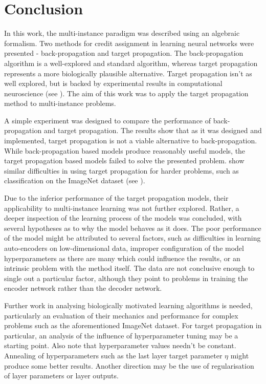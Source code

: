 \chapter*{Conclusion}

In this work, the multi-instance paradigm was described using an algebraic formalism. Two methods for credit assignment in learning neural networks were presented - back-propagation and target propagation. The back-propagation algorithm is a well-explored and standard algorithm, whereas target propagation represents a more biologically plausible alternative. Target propagation isn't as well explored, but is backed by experimental results in computational neuroscience (see \cite{guerguiev_towards_2017}). The aim of this work was to apply the target propagation method to multi-instance problems.

A simple experiment was designed to compare the performance of back-propagation and target propagation. The results show that as it was designed and implemented, target propagation is not a viable alternative to back-propagation. While back-propagation based models produce reasonably useful models, the target propagation based models failed to solve the presented problem. \cite{bartunov_assessing_2018} show similar difficulties in using target propagation for harder problems, such as classification on the ImageNet dataset (see \cite{russakovsky_imagenet_2015}).

Due to the inferior performance of the target propagation models, their applicability to multi-instance learning was not further explored. Rather, a deeper inspection of the learning process of the models was concluded, with several hypotheses as to why the model behaves as it does. The poor performance of the model might be attributed to several factors, such as difficulties in learning auto-encoders on low-dimensional data, improper configuration of the model hyperparameters as there are many which could influence the results, or an intrinsic problem with the method itself. The data are not conclusive enough to single out a particular factor, although they point to problems in training the encoder network rather than the decoder network.

Further work in analysing biologically motivated learning algorithms is needed, particularly an evaluation of their mechanics and performance for complex problems such as the aforementioned ImageNet dataset. For target propagation in particular, an analysis of the influence of hyperparameter tuning may be a starting point. Also note that hyperparameter values needn't be constant. Annealing of hyperparameters such as the last layer target parameter \( \eta \) might produce some better results. Another direction may be the use of regularisation of layer parameters or layer outputs.
